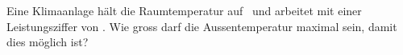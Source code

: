 Eine Klimaanlage hält die Raumtemperatur auf \tiO\ und arbeitet mit einer Leistungsziffer von \eKO. Wie gross darf die Aussentemperatur maximal sein, damit dies möglich ist?
